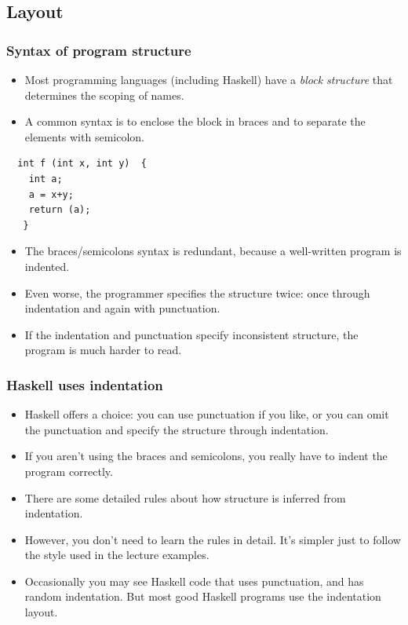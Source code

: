 \documentclass{beamer}
\begin{document}
\subsection{Layout}
\begin{frame}[fragile]
\frametitle{Syntax of program structure}

\begin{itemize}
\item Most programming languages (including Haskell) have a
  \emph{block structure} that determines the scoping of names.
\item A common syntax is to enclose the block in braces and to
  separate the elements with semicolon.
\end{itemize}

\begin{verbatim}
  int f (int x, int y)  { 
    int a;
    a = x+y;
    return (a);
   } 
\end{verbatim}

\begin{itemize}
\item The braces/semicolons syntax is redundant, because a
  well-written program is indented.
\item Even worse, the programmer specifies the structure twice:
  once through indentation and again with punctuation.
\item If the indentation and punctuation specify inconsistent
  structure, the program is much harder to read.
\end{itemize}

\end{frame}

\begin{frame}
\frametitle{Haskell uses indentation}

\begin{itemize}
\item Haskell offers a choice: you can use punctuation if you like,
  or you can omit the punctuation and specify the structure through
  indentation.
\item If you aren't using the braces and semicolons, you really
  have to indent the program correctly.
\item There are some detailed rules about how structure is inferred
  from indentation.
\item However, you don't need to learn the rules in detail.  It's
  simpler just to follow the style used in the lecture examples.
\item Occasionally you may see Haskell code that uses punctuation,
  and has random indentation.  But most good Haskell programs use
  the indentation layout.
\end{itemize}

\end{frame}
\end{document}
